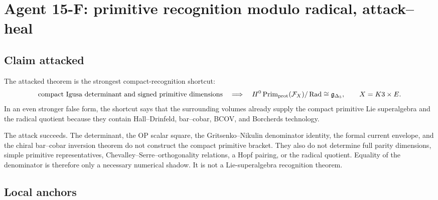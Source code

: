 \section{Agent 15-F: primitive recognition modulo radical, attack--heal}
\label{sec:agent15f-primitive-recognition-mod-radical}

\providecommand{\Deltafive}{\Delta_5}
\providecommand{\gDelta}{\mathfrak g_{\Delta_5}}
\providecommand{\Aden}{\mathcal A_{\mathrm{den}}}
\providecommand{\Den}{\mathsf{Den}}
\providecommand{\Prim}{\operatorname{Prim}}
\providecommand{\Primprot}{\operatorname{Prim}_{\mathrm{prot}}}
\providecommand{\Rad}{\operatorname{Rad}}
\providecommand{\sdim}{\operatorname{sdim}}
\providecommand{\smult}{\operatorname{smult}}
\providecommand{\CoHA}{\operatorname{CoHA}}
\providecommand{\Hall}{\mathcal H}
\providecommand{\Ran}{\operatorname{Ran}}
\providecommand{\Spch}{\mathrm{Sp}^{\mathrm{ch}}}
\providecommand{\PhiFA}{\Phi^{\mathrm{FA}}}
\providecommand{\epsor}{\epsilon_o}
\providecommand{\nuDelta}{\nu_{\Delta_5}}

\subsection{Claim attacked}

The attacked theorem is the strongest compact-recognition shortcut:
\[
   \hbox{compact Igusa determinant and signed primitive dimensions}
   \quad\Longrightarrow\quad
   H^0\Primprot(\mathcal F_X)/\Rad \cong \gDelta ,
   \qquad X=K3\times E.
\]
In an even stronger false form, the shortcut says that the surrounding
volumes already supply the compact primitive Lie superalgebra and the
radical quotient because they contain Hall--Drinfeld, bar--cobar, BCOV,
and Borcherds technology.

The attack succeeds.  The determinant, the OP scalar square, the
Gritsenko--Nikulin denominator identity, the formal current envelope, and
the chiral bar--cobar inversion theorem do not construct the compact
primitive bracket.  They also do not determine full parity dimensions,
simple primitive representatives, Chevalley--Serre--orthogonality
relations, a Hopf pairing, or the radical quotient.  Equality of the
denominator is therefore only a necessary numerical shadow.  It is not a
Lie-superalgebra recognition theorem.

\subsection{Local anchors}

